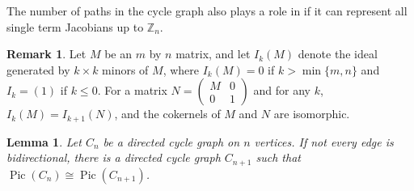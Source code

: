 \documentclass[11pt,reqno]{amsart}
\DeclareMathOperator{\Pic}{Pic}
\theoremstyle{definition}
\newtheorem{rmk}[mydef]{\textbf{Remark}}
\theoremstyle{plain}
\newtheorem{lem}[mydef]{\textbf{Lemma}}
\begin{document}
		The number of paths in the cycle graph also plays a role in if it can represent all single term Jacobians up
		to $\mathbb{Z}_n$.
		
		\begin{rmk}
			Let $M$ be an $m$ by $n$ matrix, 
			and let $I_k(M)$ denote the ideal generated by $k \times k$ minors of $M$, 
			where $I_k(M) = 0$ if $k > \min\{m,n\}$ and $I_k = (1)$ if $k \le 0$. 
			For a matrix $N = \left( \begin{array}{c|c}
				M & 0 \\
				\hline
				0 & 1
			\end{array} \right)$ and for any $k$, $I_k(M) = I_{k+1}(N)$, and the cokernels of $M$ and $N$ are isomorphic. 
		\end{rmk}

		\begin{lem}
		Let $C_n$ be a directed cycle graph on $n$ vertices. If not every edge is bidirectional, there is a directed cycle graph $C_{n+1}$ such that $\Pic (C_n) \cong \Pic (C_{n+1})$. 
		\end{lem}
\end{document}

